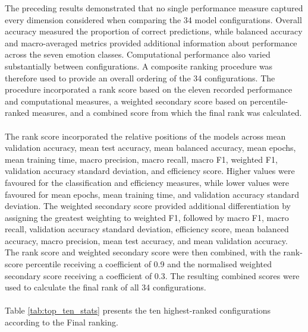\documentclass[12pt, a4paper]{report}
\begin{document}
			The preceding results demonstrated that no single performance measure captured every dimension considered when comparing the 34 model configurations. Overall accuracy measured the proportion of correct predictions, while balanced accuracy and macro-averaged metrics provided additional information about performance across the seven emotion classes. Computational performance also varied substantially between configurations. A composite ranking procedure was therefore used to provide an overall ordering of the 34 configurations. The procedure incorporated a rank score based on the eleven recorded performance and computational measures, a weighted secondary score based on percentile-ranked measures, and a combined score from which the final rank was calculated.\\\\
			The rank score incorporated the relative positions of the models across mean validation accuracy, mean test accuracy, mean balanced accuracy, mean epochs, mean training time, macro precision, macro recall, macro F1, weighted F1, validation accuracy standard deviation, and efficiency score. Higher values were favoured for the classification and efficiency measures, while lower values were favoured for mean epochs, mean training time, and validation accuracy standard deviation. The weighted secondary score provided additional differentiation by assigning the greatest weighting to weighted F1, followed by macro F1, macro recall, validation accuracy standard deviation, efficiency score, mean balanced accuracy, macro precision, mean test accuracy, and mean validation accuracy. The rank score and weighted secondary score were then combined, with the rank-score percentile receiving a coefficient of 0.9 and the normalised weighted secondary score receiving a coefficient of 0.3. The resulting combined scores were used to calculate the final rank of all 34 configurations.\\\\
			Table \ref{tab:top_ten_stats} presents the ten highest-ranked configurations according to the Final ranking.\\
			\setlength{\tabcolsep}{3pt}
\end{document}
